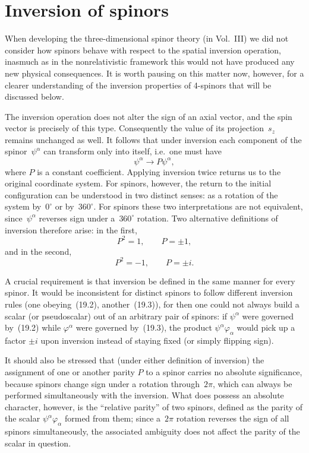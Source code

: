 \section{Inversion of spinors}

When developing the three-dimensional spinor theory (in Vol.~III) we did not consider how spinors behave with respect to the spatial inversion operation, inasmuch as in the nonrelativistic framework this would not have produced any new physical consequences. It is worth pausing on this matter now, however, for a clearer understanding of the inversion properties of 4-spinors that will be discussed below.

The inversion operation does not alter the sign of an axial vector, and the spin vector is precisely of this type. Consequently the value of its projection~$s_z$ remains unchanged as well. It follows that under inversion each component of the spinor~$\psi^\alpha$ can transform only into itself, i.e.\ one must have
\begin{equation}
\psi^\alpha \to P\psi^\alpha,
\tag{19.1}
\end{equation}
where $P$ is a constant coefficient. Applying inversion twice returns us to the original coordinate system. For spinors, however, the return to the initial configuration can be understood in two distinct senses: as a rotation of the system by~$0^\circ$ or by~$360^\circ$. For spinors these two interpretations are not equivalent, since~$\psi^\alpha$ reverses sign under a~$360^\circ$ rotation. Two alternative definitions of inversion therefore arise: in the first,
\begin{equation}
P^2 = 1,\qquad P = \pm 1,
\tag{19.2}
\end{equation}
and in the second,
\begin{equation}
P^2 = -1,\qquad P = \pm i.
\tag{19.3}
\end{equation}

A crucial requirement is that inversion be defined in the same manner for every spinor. It would be inconsistent for distinct spinors to follow different inversion rules (one obeying~(19.2), another~(19.3)), for then one could not always build a scalar (or pseudoscalar) out of an arbitrary pair of spinors: if $\psi^\alpha$ were governed by~(19.2) while $\varphi^\alpha$ were governed by~(19.3), the product $\psi^\alpha\varphi_\alpha$ would pick up a factor $\pm i$ upon inversion instead of staying fixed (or simply flipping sign).

It should also be stressed that (under either definition of inversion) the assignment of one or another parity $P$ to a spinor carries no absolute significance, because spinors change sign under a rotation through~$2\pi$, which can always be performed simultaneously with the inversion. What does possess an absolute character, however, is the ``relative parity'' of two spinors, defined as the parity of the scalar $\psi^\alpha\varphi_\alpha$ formed from them; since a~$2\pi$ rotation reverses the sign of all spinors simultaneously, the associated ambiguity does not affect the parity of the scalar in question.


